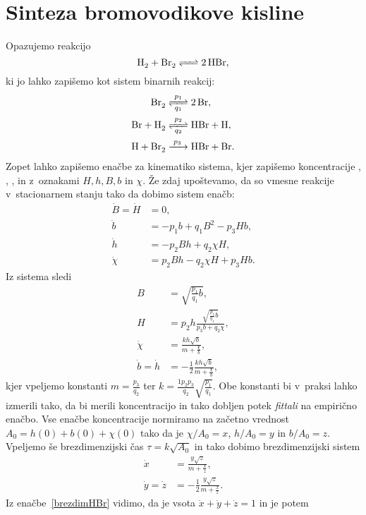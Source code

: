 \documentclass[a4paper,pdftex,12pt]{article}
\numberwithin{figure}{section} %
\begin{document}
\section{Sinteza bromovodikove kisline}
Opazujemo reakcijo
$$ \ce{H2 + Br2 <=> 2HBr},$$
ki jo lahko zapišemo kot sistem binarnih reakcij:
\begin{align}\label{sinteza}
    \ce{Br2 &<=>[\ce{$p_1$}][\ce{$q_1$}] 2Br}, \\
    \ce{Br + H2 &<=>[\ce{$p_2$}][\ce{$q_2$}] HBr + H}, \\
    \ce{H + Br2 &->[\ce{$p_3$}] HBr + Br}.
\end{align}
Zopet lahko zapišemo enačbe za kinematiko sistema, kjer zapišemo koncentracije , 
, ,  in  z~oznakami $H, h, B, b$ in $\chi$. Že zdaj
upoštevamo, da so vmesne reakcije v~stacionarnem stanju  tako da dobimo 
sistem enačb:
\begin{align*}
    \dot{B} = \dot{H} &= 0, \\
    \dot{b} &= -p_1 b + q_1 B^2 - p_3 H b, \\
    \dot{h} &= -p_2 B h + q_2 \chi H, \\
    \dot{\chi} &= p_2 B h -q_2 \chi H + p_3 H b.
\end{align*}
Iz sistema sledi
\begin{align*}
    B &= \sqrt{\frac{p_1}{q_1}b}, \\
    H &= p_2 h \frac{\sqrt{\frac{p_1}{q_1}b}}{p_3b + q_2\chi}, \\
    \dot{\chi} &= \frac{k h \sqrt{b}}{m + \frac{\chi}{b}}, \\
    \dot{b} = \dot{h} &= - \frac{1}{2}\frac{k h \sqrt{b}}{m + \frac{\chi}{b}},
\end{align*}
kjer vpeljemo konstanti $m=\frac{p_3}{q_2}$ ter $k=\frac{1p_2p_3}{q_2}\sqrt{\frac{p_1}{q_1}}
$. Obe konstanti bi v~praksi lahko izmerili tako, da bi merili koncentracijo \ce{[Hbr]} in
tako dobljen potek \emph{fittali} na empirično enačbo.
Vse enačbe koncentracije normiramo na začetno vrednost $A_0 = h(0) + b(0) + \chi (0)$
tako da je $\chi/A_0 = x$, $h/A_0 = y$ in $b/A_0 = z$. Vpeljemo še brezdimenzijski čas 
$\tau = k \sqrt{A_0}$ in tako dobimo brezdimenzijski sistem
\begin{align}\label{brezdimHBr}
    \dot{x} &= \frac{y \sqrt{z}}{m + \frac{x}{z}}, \\
    \dot{y} = \dot{z} &= - \frac{1}{2} \frac{y \sqrt{z}}{m + \frac{x}{z}}.
\end{align}
Iz enačbe~\ref{brezdimHBr} vidimo, da je vsota $\dot{x} + \dot{y} + \dot{z} =1$ in je potem
\end{document}
